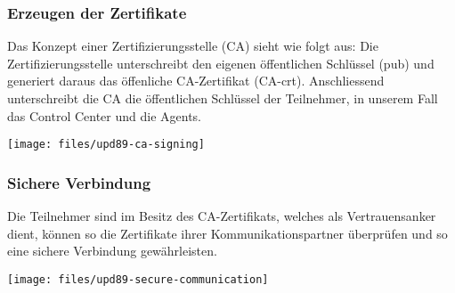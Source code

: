 \subsubsection*{Erzeugen der Zertifikate}
Das Konzept einer Zertifizierungsstelle (CA) sieht wie folgt aus: Die Zertifizierungsstelle unterschreibt den eigenen öffentlichen Schlüssel (pub) und generiert daraus das öffenliche CA-Zertifikat (CA-crt). Anschliessend unterschreibt die CA die öffentlichen Schlüssel der Teilnehmer, in unserem Fall das Control Center und die Agents.

\begin{center}
    \texttt{[image: files/upd89-ca-signing]}
\end{center}

\xxx[caption!]

\clearpage
\subsubsection*{Sichere Verbindung}

Die Teilnehmer sind im Besitz des CA-Zertifikats, welches als Vertrauensanker dient, können so die Zertifikate ihrer Kommunikationspartner überprüfen und so eine sichere Verbindung gewährleisten.


\begin{center}
    \texttt{[image: files/upd89-secure-communication]}
\end{center}

\xxx[caption!]

